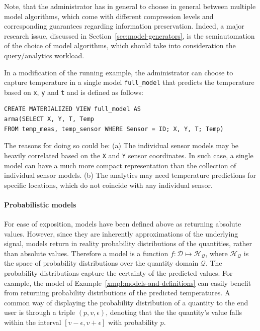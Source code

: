 Note, that the administrator has in general to choose in general between multiple model algorithms, which come with different compression levels and corresponding guarantees regarding information preservation. Indeed, a major research issue, discussed in Section~\ref{sec:model-generators}, is the semiautomation of the choice of model algorithms, which should take into consideration the query/analytics workload.

\vspace*{0.5cm}
\begin{example}
In a modification of the running example, the administrator can choose to capture temperature in a single model \texttt{full\_model} that predicts the temperature based on \texttt{x}, \texttt{y} and \texttt{t} and is defined as follows:
\begin{verbatim}
CREATE MATERIALIZED VIEW full_model AS 
arma(SELECT X, Y, T, Temp
FROM temp_meas, temp_sensor WHERE Sensor = ID; X, Y, T; Temp)
\end{verbatim}

The reasons for doing so could be: (a) The individual sensor models may be heavily correlated based on the \texttt{X} and \texttt{Y} sensor coordinates. In such case, a single model can have a much more compact representation than the collection of individual sensor models.
(b) The analytics may need temperature predictions for specific locations, which do not coincide with any individual sensor.
\end{example}
\vspace*{0.5cm}


\paragraph{Probabilistic models} For ease of exposition, models have been defined above as returning absolute values. However, since they are inherently approximations of the underlying signal, models return in reality probability distributions of the quantities, rather than absolute values. Therefore a model is a function $f:\mathcal{D}\mapsto \mathcal{H_{Q}}$, where $\mathcal{H_{Q}}$ is the space of probability distributions over the quantity domain $\mathcal{Q}$. The probability distributions capture the certainty of the predicted values. For example, the model of Example~\ref{xmpl:models-and-definitions} can easily benefit from returning probability distributions of the predicted temperatures. A common way of displaying the probability distribution of a quantity to the end user is through a triple $(p, v, \epsilon)$, denoting that the the quantity's value falls within the interval $[v - \epsilon, v + \epsilon]$ with probability $p$.\\


